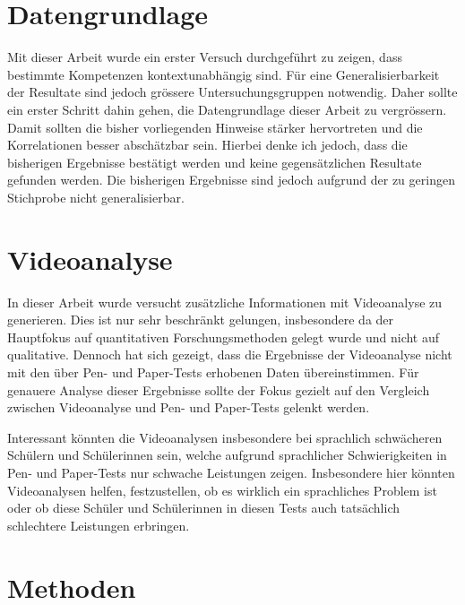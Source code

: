 \section{Datengrundlage}

Mit dieser Arbeit wurde ein erster Versuch durchgeführt zu zeigen, dass bestimmte Kompetenzen kontextunabhängig sind. Für eine Generalisierbarkeit der Resultate sind jedoch grössere Untersuchungsgruppen notwendig. Daher sollte ein erster Schritt dahin gehen, die Datengrundlage dieser Arbeit zu vergrössern. Damit sollten die bisher vorliegenden Hinweise stärker hervortreten und die Korrelationen besser abschätzbar sein.
Hierbei denke ich jedoch, dass die bisherigen Ergebnisse bestätigt werden und keine gegensätzlichen Resultate gefunden werden. Die bisherigen Ergebnisse sind jedoch aufgrund der zu geringen Stichprobe nicht generalisierbar. 




\section{Videoanalyse}

In dieser Arbeit wurde versucht zusätzliche Informationen mit Videoanalyse zu generieren. Dies ist nur sehr beschränkt gelungen, insbesondere da der Hauptfokus auf quantitativen Forschungsmethoden gelegt wurde und nicht auf qualitative. Dennoch hat sich gezeigt, dass die Ergebnisse der Videoanalyse nicht mit den über  Pen- und Paper-Tests erhobenen Daten übereinstimmen. Für genauere Analyse dieser Ergebnisse sollte der Fokus gezielt auf den Vergleich zwischen Videoanalyse und Pen- und Paper-Tests gelenkt werden. 

Interessant könnten die Videoanalysen insbesondere bei sprachlich schwächeren Schülern und Schülerinnen sein, welche aufgrund sprachlicher Schwierigkeiten in Pen- und Paper-Tests nur schwache Leistungen zeigen. Insbesondere hier könnten Videoanalysen helfen, festzustellen, ob es wirklich ein sprachliches Problem ist oder ob diese Schüler und Schülerinnen in diesen Tests auch tatsächlich schlechtere Leistungen erbringen.

\section{Methoden}

